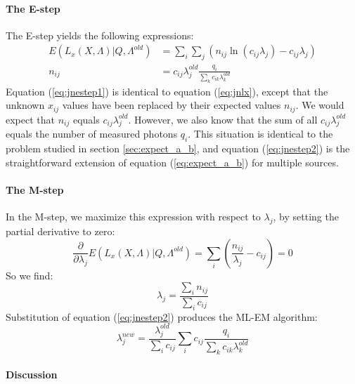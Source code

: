\documentclass[11pt,oneside]{article}
\begin{document}
\paragraph{The E-step\\}
The E-step yields the following expressions:
\begin{align}
E(L_x(X, \Lambda) | Q, \Lambda^{old}) &= 
   \sum_i \sum_j ( n_{ij} \ln (c_{ij} \lambda_j) -  c_{ij} \lambda_j)
   \label{eq:jnestep1}\\
n_{ij} &= c_{ij} \lambda_j^{old} \frac{q_i}{\sum_k c_{ik} \lambda_k^{old}}
   \label{eq:jnestep2}
\end{align}
Equation (\ref{eq:jnestep1}) is identical to equation (\ref{eq:jnlx}), except
that the unknown $x_{ij}$ values have been replaced by their expected values
$n_{ij}$. We would expect that $n_{ij}$ equals $c_{ij}
\lambda_j^{old}$. However, we also know that the sum of all $c_{ij}
\lambda_j^{old}$ equals the number of measured photons $q_i$. This situation
is identical to the problem studied in section \ref{sec:expect_a_b}, and 
equation (\ref{eq:jnestep2}) is the straightforward extension of equation
(\ref{eq:expect_a_b}) for multiple sources.

\paragraph{The M-step\\}
In the M-step, we maximize this expression with respect to $\lambda_j$, by
setting the partial derivative to zero:
\begin{equation}
\frac{\partial}{\partial \lambda_j} E(L_x(X, \Lambda) | Q, \Lambda^{old})
   =  \sum_i \left( \frac{n_{ij}}{\lambda_j} - c_{ij} \right) = 0
\end{equation}
So we find:
\begin{equation}
 \lambda_j  =  \frac{\sum_i n_{ij}}{\sum_i c_{ij}} \label{eq:jnmstep}
\end{equation}
Substitution of equation (\ref{eq:jnestep2}) produces the ML-EM
algorithm:
\begin{equation}
  \lambda_j^{new}  =  \frac{\lambda_j^{old}}{\sum_i c_{ij}}
           \sum_i c_{ij}  \frac{q_i}{\sum_k c_{ik} \lambda_k^{old}}
           \label{eq:jnmlem}
\end{equation}

\paragraph{Discussion\\}
\end{document}
